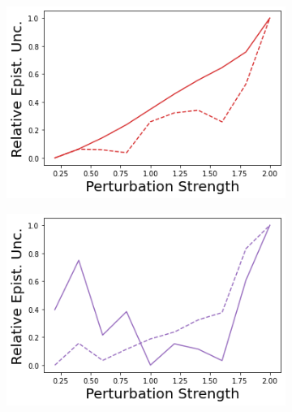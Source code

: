 \begin{figure}
    \begin{subfigure}{.24\textwidth}
        \includegraphics[width=\textwidth]{sections/011_icml2022/resources/state_shift-DropOut-CartPoleShift-v0-mean_epistemic_uncertainty_.png}
    \end{subfigure}
    \begin{subfigure}{.24\textwidth}
        \includegraphics[width=\textwidth]{sections/011_icml2022/resources/state_shift-Ensemble-CartPoleShift-v0-mean_epistemic_uncertainty_.png}
    \end{subfigure}
    \begin{subfigure}{.24\textwidth}

\end{subfigure}
\end{figure}
